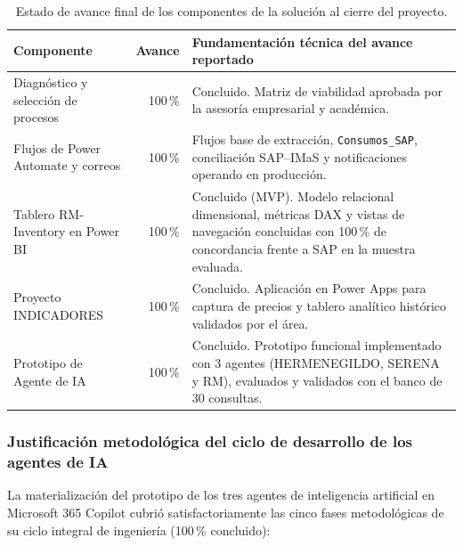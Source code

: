 \begin{table}[H]
  \centering
  \caption{Estado de avance final de los componentes de la solución al cierre del proyecto.}
  \label{tab:avance}
  \begin{tabular}{@{}p{5.6cm}r p{6.2cm}@{}}
    \toprule
    \textbf{Componente} & \textbf{Avance} & \textbf{Fundamentación técnica del avance reportado} \\
    \midrule
    Diagnóstico y selección de procesos & 100\,\% & Concluido. Matriz de viabilidad aprobada por la asesoría empresarial y académica. \\
    \addlinespace
    Flujos de Power Automate y correos & 100\,\% & Flujos base de extracción, \texttt{Consumos\_SAP}, conciliación SAP--IMaS y notificaciones operando en producción. \\
    \addlinespace
    Tablero RM-Inventory en Power BI & 100\,\% & Concluido (MVP). Modelo relacional dimensional, métricas DAX y vistas de navegación concluidas con 100\,\% de concordancia frente a SAP en la muestra evaluada. \\
    \addlinespace
    Proyecto INDICADORES & 100\,\% & Concluido. Aplicación en Power Apps para captura de precios y tablero analítico histórico validados por el área. \\
    \addlinespace
    Prototipo de Agente de IA & 100\,\% & Concluido. Prototipo funcional implementado con 3 agentes (HERMENEGILDO, SERENA y RM), evaluados y validados con el banco de 30 consultas. \\
    \bottomrule
  \end{tabular}
\end{table}

\subsubsection{Justificación metodológica del ciclo de desarrollo de los agentes de IA}

La materialización del prototipo de los tres agentes de inteligencia artificial en Microsoft 365 Copilot cubrió satisfactoriamente las cinco fases metodológicas de su ciclo integral de ingeniería (100\,\% concluido):

